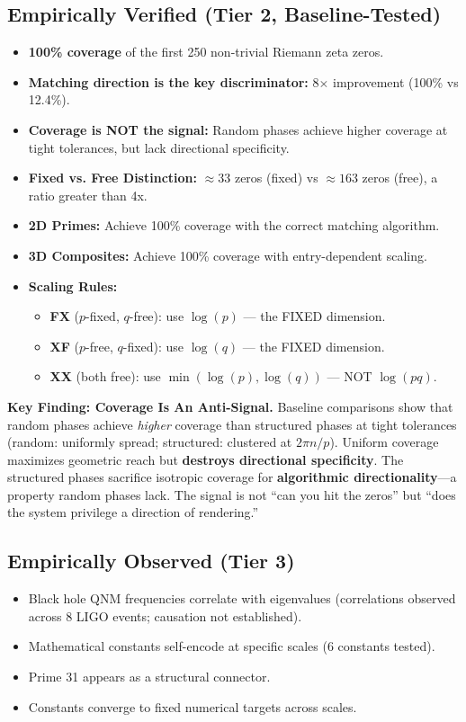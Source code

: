 \documentclass[11pt, a4paper]{article}
\newcommand{\cmark}{\ding{51}}%
\begin{document}
\subsection{Empirically Verified (Tier 2, Baseline-Tested)}
\begin{itemize}
    \item[\cmark] \textbf{100\% coverage} of the first 250 non-trivial Riemann zeta zeros.
    \item[\cmark] \textbf{Matching direction is the key discriminator:} 8$\times$ improvement (100\% vs 12.4\%).
    \item[\cmark] \textbf{Coverage is NOT the signal:} Random phases achieve higher coverage at tight tolerances, but lack directional specificity.
    \item[\cmark] \textbf{Fixed vs. Free Distinction:} $\approx 33$ zeros (fixed) vs $\approx 163$ zeros (free), a ratio greater than 4x.
    \item[\cmark] \textbf{2D Primes:} Achieve 100\% coverage with the correct matching algorithm.
    \item[\cmark] \textbf{3D Composites:} Achieve 100\% coverage with entry-dependent scaling.
    \item[\cmark] \textbf{Scaling Rules:}
    \begin{itemize}
        \item \textbf{FX} ($p$-fixed, $q$-free): use $\log(p)$ — the FIXED dimension.
        \item \textbf{XF} ($p$-free, $q$-fixed): use $\log(q)$ — the FIXED dimension.
        \item \textbf{XX} (both free): use $\min(\log(p), \log(q))$ — NOT $\log(pq)$.
    \end{itemize}
\end{itemize}

\textbf{Key Finding: Coverage Is An Anti-Signal.} Baseline comparisons show that random phases achieve \textit{higher} coverage than structured phases at tight tolerances (random: uniformly spread; structured: clustered at $2\pi n/p$). Uniform coverage maximizes geometric reach but \textbf{destroys directional specificity}. The structured phases sacrifice isotropic coverage for \textbf{algorithmic directionality}—a property random phases lack. The signal is not ``can you hit the zeros'' but ``does the system privilege a direction of rendering.''

\subsection{Empirically Observed (Tier 3)}
\begin{itemize}
    \item Black hole QNM frequencies correlate with eigenvalues (correlations observed across 8 LIGO events; causation not established).
    \item Mathematical constants self-encode at specific scales (6 constants tested).
    \item Prime 31 appears as a structural connector.
    \item Constants converge to fixed numerical targets across scales.
\end{itemize}
\end{document}

